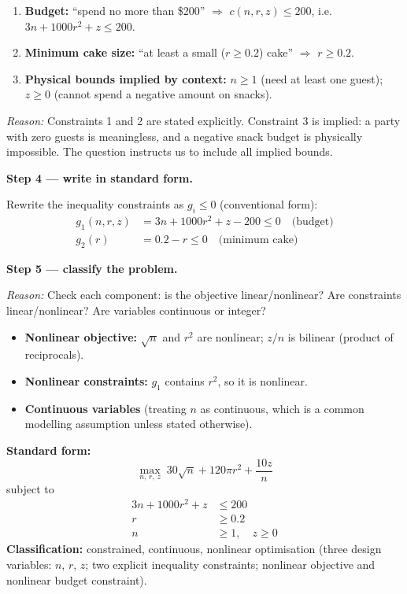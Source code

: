 \documentclass[10pt,a4paper]{article}
\newcommand{\reason}[1]{%
  \begin{mdframed}[backgroundcolor=reasonbg, linewidth=0.4pt,
    innertopmargin=3pt, innerbottommargin=3pt,
    innerleftmargin=6pt, innerrightmargin=6pt]
    \small\textit{Reason:} \small #1
  \end{mdframed}\vspace{2pt}}
\newenvironment{resultbox}{%
  \begin{mdframed}[backgroundcolor=boxbg, linewidth=0.6pt,
    innertopmargin=5pt, innerbottommargin=5pt,
    innerleftmargin=8pt, innerrightmargin=8pt]
}{\end{mdframed}}
\begin{document}
\begin{enumerate}[noitemsep]
  \item \textbf{Budget:} ``spend no more than \$200'' $\Rightarrow$
        $c(n,r,z)\le 200$, i.e.\
        $3n + 1000r^2 + z \le 200$.
  \item \textbf{Minimum cake size:} ``at least a small ($r\ge 0.2$) cake''
        $\Rightarrow$ $r \ge 0.2$.
  \item \textbf{Physical bounds implied by context:}
        $n \ge 1$ (need at least one guest);
        $z \ge 0$ (cannot spend a negative amount on snacks).
\end{enumerate}

\reason{Constraints 1 and 2 are stated explicitly. Constraint 3 is
        implied: a party with zero guests is meaningless, and a negative
        snack budget is physically impossible. The question instructs us
        to include all implied bounds.}

\textbf{Step 4 --- write in standard form.}

Rewrite the inequality constraints as $g_i \le 0$ (conventional form):
\begin{align*}
  g_1(n,r,z) &= 3n + 1000r^2 + z - 200 \le 0 \quad \text{(budget)}\\
  g_2(r)     &= 0.2 - r \le 0 \quad \text{(minimum cake)}
\end{align*}

\textbf{Step 5 --- classify the problem.}

\reason{Check each component: is the objective linear/nonlinear?
        Are constraints linear/nonlinear? Are variables continuous or
        integer?}

\begin{itemize}[noitemsep]
  \item \textbf{Nonlinear objective:} $\sqrt{n}$ and $r^2$ are nonlinear;
        $z/n$ is bilinear (product of reciprocals).
  \item \textbf{Nonlinear constraints:} $g_1$ contains $r^2$, so it is
        nonlinear.
  \item \textbf{Continuous variables} (treating $n$ as continuous, which
        is a common modelling assumption unless stated otherwise).
\end{itemize}

\begin{resultbox}
\textbf{Standard form:}
\[
  \max_{n,\,r,\,z}\; 30\sqrt{n} + 120\pi r^2 + \frac{10z}{n}
\]
subject to
\begin{align*}
  3n + 1000r^2 + z &\le 200 \\
  r &\ge 0.2 \\
  n &\ge 1,\quad z \ge 0
\end{align*}
\textbf{Classification:} constrained, continuous, nonlinear optimisation
(three design variables: $n$, $r$, $z$; two explicit inequality
constraints; nonlinear objective and nonlinear budget constraint).
\end{resultbox}
\end{document}
